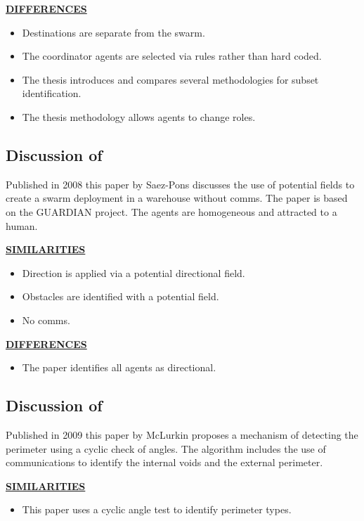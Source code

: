\documentclass[a4paper,11pt,nocenter,bold,notitlepage,noheadline,noindent]{
thesis}
\begin{document}
\textbf{\underline{DIFFERENCES}}
\begin{itemize}
   \setlength\itemsep{0em}
	\item Destinations are separate from the swarm.
	\item The coordinator agents are selected via rules rather than hard coded.
	\item The thesis introduces and compares several methodologies for subset identification.
	\item The thesis methodology allows agents to change roles. 
\end{itemize} 

\subsection{Discussion of \cite{SALGVPJ:08}}
Published in 2008 this paper by Saez-Pons discusses the use of potential fields to create a swarm deployment in a warehouse without comms. The paper is based on the GUARDIAN project. The agents are homogeneous and attracted to a human.

\textbf{\underline{SIMILARITIES}}
\begin{itemize}
   \setlength\itemsep{0em}
	\item Direction is applied via a potential directional field.
	\item Obstacles are identified with a potential field.
	\item No comms.
\end{itemize} 

\textbf{\underline{DIFFERENCES}}
\begin{itemize}
   \setlength\itemsep{0em}
	\item The paper identifies all agents as directional. 
\end{itemize} 

\subsection{Discussion of \cite{MD:09}}
Published in 2009 this paper by McLurkin proposes a mechanism of detecting the perimeter using a cyclic check of angles. The algorithm includes the use of communications to identify the internal voids and the external perimeter.

\textbf{\underline{SIMILARITIES}}
\begin{itemize}
   \setlength\itemsep{0em}
	\item This paper uses a cyclic angle test to identify perimeter types.
\end{itemize} 
\end{document}
